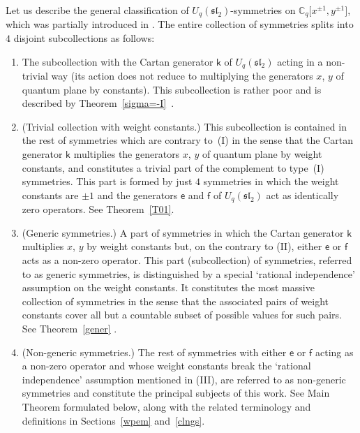 \documentclass[pdftex]{sigma}
\numberwithin{equation}{section}
\begin{document}
Let us describe the general classification of $U_q(\mathfrak{sl}_2)$-symmetries on $\mathbb{C}_q\big[x^{\pm 1},y^{\pm 1}\big]$, which was partially introduced in \cite{S}. The entire collection of symmetries splits into $4$ disjoint subcollections as follows:
\begin{enumerate}\itemsep=0pt
\item[I] The subcollection with the Cartan generator $\mathsf{k}$ of $U_q(\mathfrak{sl}_2)$ acting in a non-trivial way (its action does not reduce to multiplying the generators $x$, $y$ of quantum plane by constants). This subcollection is rather poor and is described by Theorem~\ref{sigma=-I}~\cite[Theorem 3.5]{S}.

\item[II] (Trivial collection with weight constants.) This subcollection is contained in the rest of symmetries which are contrary to~(I) in the sense that the Cartan generator $\mathsf{k}$ multiplies the generators $x$, $y$ of quantum plane by weight constants, and constitutes a trivial part of the complement to type~(I) symmetries. This part is formed by just $4$ symmetries in which the weight constants are $\pm 1$ and the generators $\mathsf{e}$ and $\mathsf{f}$ of $U_q(\mathfrak{sl}_2)$ act as identically zero operators. See Theorem~\ref{T01}.

\item[III] (Generic symmetries.) A part of symmetries in which the Cartan generator $\mathsf{k}$ multiplies $x$, $y$ by weight constants but, on the contrary to (II), either $\mathsf{e}$ or $\mathsf{f}$ acts as a non-zero operator. This part (subcollection) of symmetries, referred to as generic symmetries, is distinguished by a special `rational independence' assumption on the weight constants. It constitutes the most massive collection of symmetries in the sense that the associated pairs of weight constants cover all but a countable subset of possible values for such pairs. See Theorem~\ref{gener} \cite[Theorem~4.1]{S}.

\item[IV] (Non-generic symmetries.) The rest of symmetries with either $\mathsf{e}$ or $\mathsf{f}$ acting as a non-zero operator and whose weight constants break the `rational independence' assumption mentioned in (III), are referred to as non-generic symmetries and constitute the principal subjects of this work. See Main Theorem formulated below, along with the related terminology and definitions in Sections~\ref{wpem} and~\ref{clngs}.
\end{enumerate}
\end{document}
